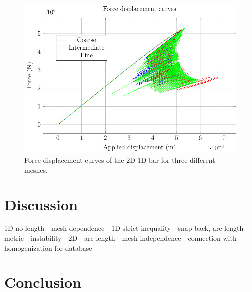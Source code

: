 \documentclass[12pt]{elsarticle}
\begin{document}
\begin{figure}[ht]
	\centering
	\includegraphics{./Images/L/force_displacement.pdf}
	\caption{Force displacement curves of the 2D-1D bar for three different meshes.}
	\label{L_force_displacement}
\end{figure}

\section{Discussion}

1D no length - mesh dependence - 1D strict inequality - snap back, arc length - metric - instability - 2D - arc length - mesh independence - connection with homogenization for database

\section{Conclusion}



\appendix
\end{document}
